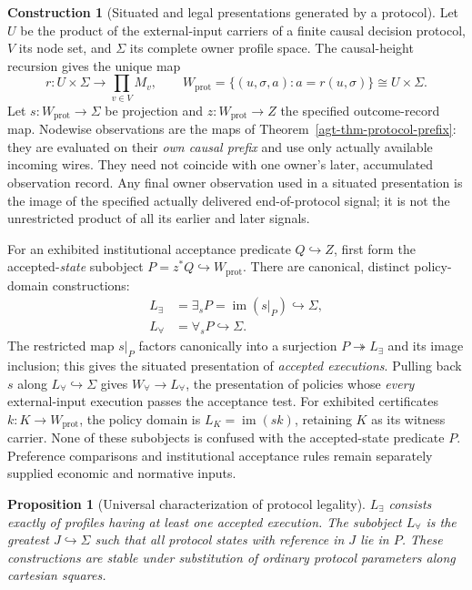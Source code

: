 \documentclass[11pt,a4paper]{article}
\numberwithin{equation}{section}
\newtheorem{proposition}[theorem]{Proposition}
\theoremstyle{definition}
\newtheorem{construction}[construction]{Construction}
\theoremstyle{remark}
\theoremstyle{plain}
\begin{document}
\begin{construction}[Situated and legal presentations generated by a protocol]
\label{agt-con-protocol-situation}
Let $U$ be the product of the external-input carriers of a finite
causal decision protocol, $V$ its node set, and $\Sigma$ its complete
owner profile space. The causal-height recursion gives the unique map
\[
 r:U\times\Sigma\longrightarrow\prod_{v\in V}M_v,
 \qquad W_{\mathrm{prot}}
 =\{(u,\sigma,a):a=r(u,\sigma)\}\cong U\times\Sigma.
\]
Let $s:W_{\mathrm{prot}}\to\Sigma$ be projection and
$z:W_{\mathrm{prot}}\to Z$ the specified outcome-record map. Nodewise
observations are the maps of Theorem~\ref{agt-thm-protocol-prefix}:
they are evaluated on their \emph{own causal prefix} and use only
actually available incoming wires. They need not coincide with one
owner's later, accumulated observation record. Any final owner
observation used in a situated presentation is the image of the
specified actually delivered end-of-protocol signal; it is not the
unrestricted product of all its earlier and later signals.

For an exhibited institutional acceptance predicate $Q\hookrightarrow Z$,
first form the accepted-\emph{state} subobject
$P=z^*Q\hookrightarrow W_{\mathrm{prot}}$. There are canonical,
distinct policy-domain constructions:
\begin{align*}
 L_{\exists}&=\exists_sP=\operatorname{im}(s|_P)
     \hookrightarrow\Sigma,\\
 L_{\forall}&=\forall_sP\hookrightarrow\Sigma.
\end{align*}
The restricted map $s|_P$ factors canonically into a surjection
$P\twoheadrightarrow L_{\exists}$ and its image inclusion; this gives
the situated presentation of \emph{accepted executions}. Pulling back
$s$ along $L_{\forall}\hookrightarrow\Sigma$ gives
$W_{\forall}\to L_{\forall}$, the presentation of policies whose
\emph{every} external-input execution passes the acceptance test.
For exhibited certificates $k:K\to W_{\mathrm{prot}}$, the policy
domain is $L_K=\operatorname{im}(sk)$, retaining $K$ as its witness
carrier. None of these subobjects is confused with the accepted-state
predicate $P$. Preference comparisons and institutional acceptance rules
remain separately supplied economic and normative inputs.
\end{construction}
\begin{proposition}[Universal characterization of protocol legality]
\label{agt-prop-protocol-legality}
$L_{\exists}$ consists exactly of profiles having at least one
accepted execution. The subobject $L_{\forall}$ is the greatest
$J\hookrightarrow\Sigma$ such that all protocol states with reference
in $J$ lie in $P$. These constructions are stable under substitution of
ordinary protocol parameters along cartesian squares.
\end{proposition}
\end{document}

